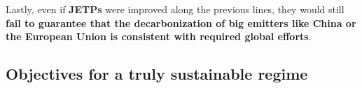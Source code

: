 \documentclass[12pt,english]{article}
\begin{document}
Lastly, even if \textbf{JETPs} were improved along the previous lines, they would still \textbf{fail to guarantee that the decarbonization of big emitters like China or the European Union is consistent with required global efforts}. 


\subsection{Objectives for a truly sustainable regime\label{subsec:objectives}}
\end{document}
